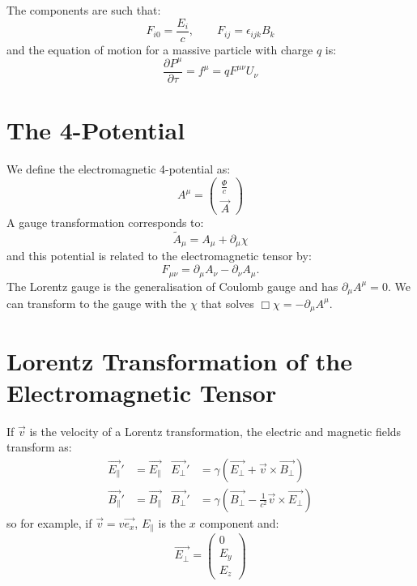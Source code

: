 \documentclass[../Main.tex]{subfiles}
\begin{document}
The components are such that:
\begin{equation*}
    F_{i0} = \frac{E_i}{c},\qquad F_{ij} = \epsilon_{ijk} B_k
\end{equation*}
and the equation of motion for a massive particle with charge $q$ is:
\begin{equation*}
    \frac{\partial P^\mu}{\partial \tau} = f^\mu = q F^{\mu \nu} U_\nu
\end{equation*}
\section{The 4-Potential}
We define the electromagnetic 4-potential as:
\begin{equation*}
    A^\mu = \begin{pmatrix}\frac{\Phi}{c} \\ \vec{A}\end{pmatrix}
\end{equation*}
A gauge transformation corresponds to:
\begin{equation*}
    \tilde{A}_\mu = A_\mu + \partial_\mu \chi
\end{equation*}
and this potential is related to the electromagnetic tensor by:
\begin{equation*}
    F_{\mu \nu} = \partial_\mu A_\nu - \partial_\nu A_\mu.
\end{equation*}
The Lorentz gauge is the generalisation of Coulomb gauge and has $\partial_\mu A^\mu = 0$. We can transform to the gauge with the $\chi$ that solves $\Box \chi = -\partial_\mu A^\mu$.
\section{Lorentz Transformation of the Electromagnetic Tensor}
If $\vec{v}$ is the velocity of a Lorentz transformation, the electric and magnetic fields transform as:
\begin{align*}
    \vec{E_\parallel}' &= \vec{E_\parallel} & \vec{E_\perp}' &= \gamma (\vec{E_\perp} + \vec{v} \times \vec{B_\perp}) \\
    \vec{B_\parallel}' &= \vec{B_\parallel} & \vec{B_\perp}' &= \gamma \left(\vec{B_\perp} - \frac{1}{c^2} \vec{v} \times \vec{E_\perp}\right)
\end{align*}
so for example, if $\vec{v} = v\vec{e_x}$, $E_\parallel$ is the $x$ component and:
\begin{equation*}
    \vec{E_\perp} = \begin{pmatrix}0 \\ E_y \\ E_z\end{pmatrix}
\end{equation*}
\end{document}
